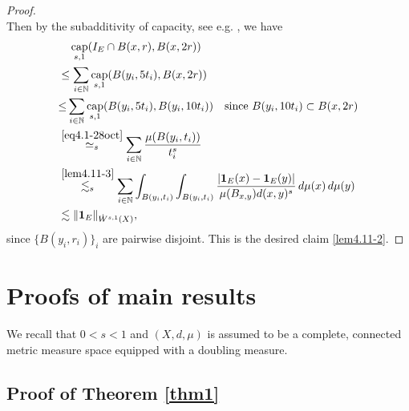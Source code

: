 \documentclass[11pt,leqno]{amsart}
\numberwithin{equation}{section}
\theoremstyle{definition}
\DeclareMathOperator{\capp}{cap}
\newcommand{\caps}{\capp_{s,1}}
\begin{document}
\begin{proof}
\[		\]
		Then by the  subadditivity of capacity, see e.g. \cite[Proposition 3.4]{BB23}, we have
		\begin{align*}
			&\quad \caps(I_E\cap B(x,r),B(x,2r))\\
			&\leq \sum_{i\in \mathbb N} \caps(B(y_i,5 t_i), B(x,2r))\\
			&{\leq} \sum_{i\in \mathbb N} \caps(B(y_i,5 t_i), B(y_i,10  t_i))
			\quad \textrm{since\ }B(y_i,10 t_i)\subset B(x,2r)\\
			&\overset{\eqref{eq4.1-28oct}}{\simeq_s} \sum_{i\in\mathbb N} \frac{\mu(B(y_i,t_i))}{t_i^s}\\
			&\overset{\eqref{lem4.11-3}}{\lesssim_s}\sum_{i\in \mathbb N}\int_{B(y_i,  t_i)}\int_{B(y_i, t_i)}\frac{|{\bf 1}_E(x)-{\bf 1}_E(y)|}{\mu(B_{x,y})d(x,y)^s}\,d\mu(x)\,d\mu(y)\\
			&\lesssim\|{\bf 1}_{E}\|_{\dot W^{s,1}(X)},
		\end{align*}
		since $\{B(y_i, r_i)\}_i$ are pairwise disjoint.
		This is the desired claim \eqref{lem4.11-2}. 
	\end{proof}
	
	\section{Proofs of main results}
	We recall  that $0<s<1$  and $(X,d,\mu)$ is assumed to be  a complete, connected metric measure space equipped with a doubling measure.
	\subsection{Proof of Theorem \ref{thm1}}\
	
\end{document}
